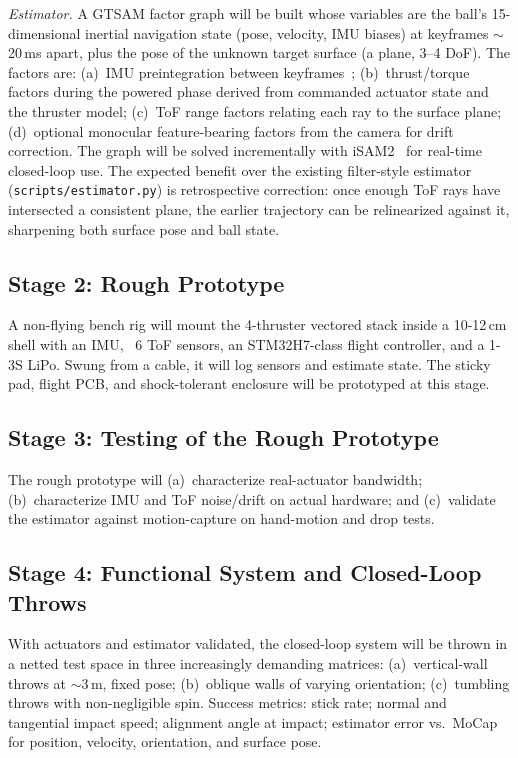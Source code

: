 \documentclass[11pt]{article}
\begin{document}
\emph{Estimator.} A GTSAM factor graph will be built whose variables are the
ball's 15-dimensional inertial navigation state (pose, velocity, IMU biases)
at keyframes $\sim$20\,ms apart, plus the pose of the unknown target surface
(a plane, 3--4 DoF). The factors are:
(a)~IMU preintegration between keyframes~\cite{forster2017imu};
(b)~thrust/torque factors during the powered phase derived from commanded
actuator state and the thruster model;
(c)~ToF range factors relating each ray to the surface plane;
(d)~optional monocular feature-bearing factors from the camera for drift
correction.
The graph will be solved incrementally with iSAM2~\cite{kaess2012isam2} for
real-time closed-loop use. The expected benefit over the existing
filter-style estimator (\texttt{scripts/estimator.py}) is retrospective
correction: once enough ToF rays have intersected a consistent plane, the
earlier trajectory can be relinearized against it, sharpening both surface
pose and ball state.

\subsection{Stage 2: Rough Prototype}

A non-flying bench rig will mount the 4-thruster vectored stack inside a
10-12\,cm shell with an IMU, ~6 ToF sensors, an STM32H7-class flight controller, and a 1-3S LiPo.
Swung from a cable, it will log sensors and estimate state. The sticky pad, flight PCB, and shock-tolerant
enclosure will be prototyped at this stage.

\subsection{Stage 3: Testing of the Rough Prototype}

The rough prototype will (a)~characterize real-actuator bandwidth;
(b)~characterize IMU and ToF noise/drift on actual hardware; and
(c)~validate the estimator against motion-capture on hand-motion and drop tests.

\subsection{Stage 4: Functional System and Closed-Loop Throws}

With actuators and estimator validated, the closed-loop system will be
thrown in a netted test space in three increasingly demanding matrices:
(a)~vertical-wall throws at $\sim$3\,m, fixed pose; (b)~oblique walls of
varying orientation; (c)~tumbling throws with non-negligible spin.
Success metrics: stick rate; normal and tangential impact speed;
alignment angle at impact; estimator error vs.\ MoCap for position,
velocity, orientation, and surface pose.
\end{document}

